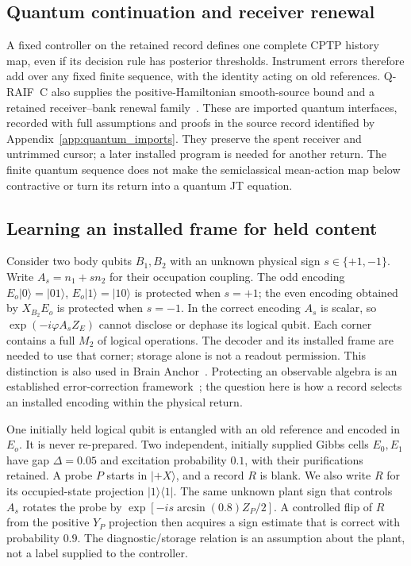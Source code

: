 \documentclass[12pt]{article}
\theoremstyle{definition}
\theoremstyle{remark}
\begin{document}
\subsection{Quantum continuation and receiver renewal}
\label{subsec:continuation}
A fixed controller on the retained record defines one complete CPTP
history map, even if its decision rule has posterior thresholds.
Instrument errors therefore add over any fixed finite sequence,
with the identity acting on old references.
Q-RAIF~C also supplies the positive-Hamiltonian smooth-source bound
and a retained receiver--bank renewal family~\cite{QRAIFC}.
These are imported quantum interfaces, recorded with full assumptions
and proofs in the source record identified by Appendix~\ref{app:quantum_imports}.
They preserve the spent receiver and untrimmed cursor; a later installed
program is needed for another return.
The finite quantum sequence does not make the semiclassical mean-action
map below contractive or turn its return into a quantum JT equation.

\subsection{Learning an installed frame for held content}

Consider two body qubits $B_1,B_2$ with an unknown physical sign
$s\in\{+1,-1\}$. Write $A_s=n_1+s n_2$ for their occupation
coupling. The odd encoding $E_o|0\rangle=|01\rangle$,
$E_o|1\rangle=|10\rangle$ is protected when $s=+1$;
the even encoding obtained by $X_{B_2}E_o$ is protected when $s=-1$.
In the correct encoding $A_s$ is scalar, so
$\exp(-i\varphi A_s Z_E)$ cannot disclose or dephase its logical
qubit. Each corner contains a full $M_2$ of logical operations.
The decoder and its installed frame are needed to use that corner;
storage alone is not a readout permission. This distinction is also
used in Brain Anchor~\cite{BrainAnchor}.
Protecting an observable algebra is an established error-correction
framework~\cite{BenyKempfKribs2007}; the question here is how a record
selects an installed encoding within the physical return.

One initially held logical qubit is entangled with an old reference
and encoded in $E_o$. It is never re-prepared. Two independent,
initially supplied Gibbs cells $E_0,E_1$ have gap $\Delta=0.05$ and
excitation probability $0.1$, with their purifications retained.
A probe $P$ starts in $|+X\rangle$, and a record $R$ is blank.
We also write $R$ for its occupied-state projection $|1\rangle\langle1|$.
The same unknown plant sign that controls $A_s$ rotates the probe by
$\exp[-is\arcsin(0.8)Z_P/2]$. A controlled flip of $R$ from the
positive $Y_P$ projection then acquires a sign estimate that is correct
with probability $0.9$. The diagnostic/storage relation is an assumption
about the plant, not a label supplied to the controller.
\end{document}
